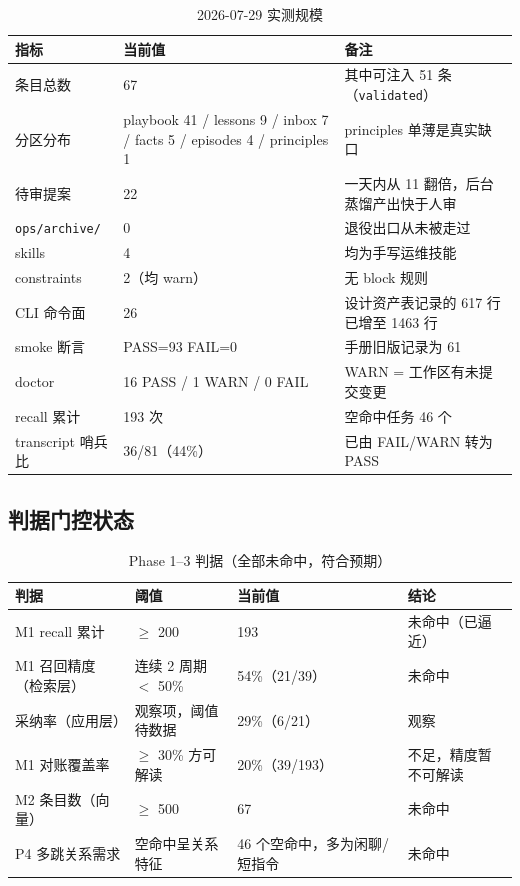 \documentclass[12pt,a4paper]{ctexart}
\begin{document}
\begin{table}[H]
\centering
\caption{2026-07-29 实测规模}
\begin{tabular}{@{}lp{4.6cm}p{4.6cm}@{}}
\toprule
\textbf{指标} & \textbf{当前值} & \textbf{备注} \\
\midrule
条目总数 & 67 & 其中可注入 51 条（\texttt{validated}） \\
分区分布 & playbook 41 / lessons 9 / inbox 7 / facts 5 / episodes 4 / principles 1 & principles 单薄是真实缺口 \\
待审提案 & 22 & 一天内从 11 翻倍，后台蒸馏产出快于人审 \\
\texttt{ops/archive/} & 0 & 退役出口从未被走过 \\
skills & 4 & 均为手写运维技能 \\
constraints & 2（均 warn） & 无 block 规则 \\
CLI 命令面 & 26 & 设计资产表记录的 617 行已增至 1463 行 \\
smoke 断言 & PASS=93 FAIL=0 & 手册旧版记录为 61 \\
doctor & 16 PASS / 1 WARN / 0 FAIL & WARN = 工作区有未提交变更 \\
recall 累计 & 193 次 & 空命中任务 46 个 \\
transcript 哨兵比 & 36/81（44\%） & 已由 FAIL/WARN 转为 PASS \\
\bottomrule
\end{tabular}
\end{table}

\subsection{判据门控状态}

\begin{table}[H]
\centering
\caption{Phase 1--3 判据（全部未命中，符合预期）}
\begin{tabular}{@{}lp{3.1cm}p{3.6cm}p{2.9cm}@{}}
\toprule
\textbf{判据} & \textbf{阈值} & \textbf{当前值} & \textbf{结论} \\
\midrule
M1 recall 累计 & $\geq$ 200 & 193 & 未命中（已逼近） \\
M1 召回精度（检索层） & 连续 2 周期 $<$ 50\% & 54\%（21/39） & 未命中 \\
采纳率（应用层） & 观察项，阈值待数据 & 29\%（6/21） & 观察 \\
M1 对账覆盖率 & $\geq$ 30\% 方可解读 & 20\%（39/193） & \textcolor{evored}{不足，精度暂不可解读} \\
M2 条目数（向量） & $\geq$ 500 & 67 & 未命中 \\
P4 多跳关系需求 & 空命中呈关系特征 & 46 个空命中，多为闲聊/短指令 & 未命中 \\
\bottomrule
\end{tabular}
\end{table}
\end{document}
